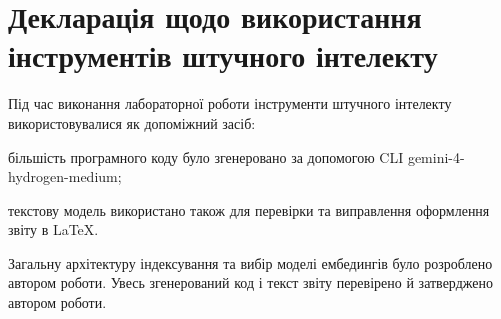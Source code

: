 \clearpage
{}
\chapter*{Декларація щодо використання інструментів штучного інтелекту}
\label{chapter:ai-declaration}

Під час виконання лабораторної роботи інструменти штучного інтелекту використовувалися як допоміжний засіб:
\begin{dashlist}[wide]
    \item більшість програмного коду було згенеровано за допомогою CLI gemini-4-hydrogen-medium;
    \item текстову модель використано також для перевірки та виправлення оформлення звіту в \LaTeX.
\end{dashlist}

Загальну архітектуру індексування та вибір моделі ембедингів було розроблено автором роботи. Увесь згенерований код і текст звіту перевірено й затверджено автором роботи.
